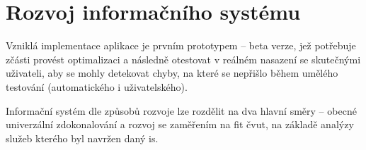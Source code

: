 \chapter{Rozvoj informačního systému}

Vzniklá implementace aplikace je prvním prototypem -- beta verze, jež potřebuje zčásti provést optimalizaci a následně otestovat v reálném nasazení se skutečnými uživateli, aby se mohly detekovat chyby, na které se nepřišlo během umělého testování (automatického i uživatelského).

Informační systém dle způsobů rozvoje lze rozdělit na dva hlavní směry -- obecné univerzální zdokonalování a rozvoj se zaměřením na \gls{fit} \gls{čvut}, na základě analýzy služeb kterého byl navržen daný \gls{is}. 


